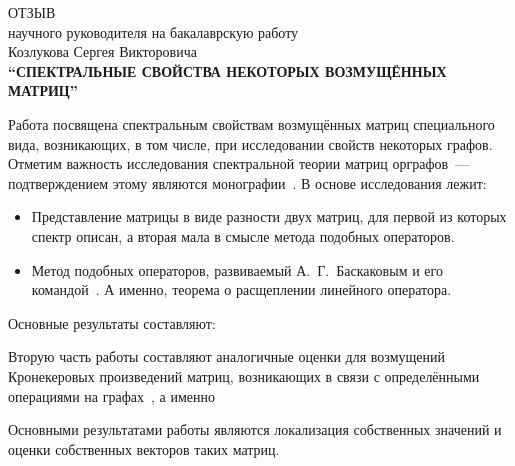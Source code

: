 \begin{center}
  ОТЗЫВ\\
  научного руководителя на бакалаврскую работу\\
  Козлукова Сергея Викторовича\\
  \textbf{``СПЕК\-ТРАЛЬНЫЕ СВОЙ\-СТВА НЕКОТОРЫХ ВОЗМУЩ\-ЁННЫХ МАТРИЦ''}
\end{center}

Работа посвящена спектральным свойствам возмущённых матриц
специального вида, возникающих, в том числе, при исследовании свойств некоторых
графов. Отметим важность исследования спектральной теории матриц орграфов~---%
подтверждением этому являются монографии~\cite{cvetkovic1997eigenspaces,cvetkovic1980spectra,godsil2013algebraic}.
В основе исследования лежит:
\begin{itemize}
  \item Представление матрицы в виде разности двух матриц, для первой из которых
    спектр описан, а вторая мала в смысле метода подобных операторов.
    \item Метод подобных операторов, развиваемый А.~Г.~Баскаковым и его
      командой~\cite{baskakov1986theorem,baskakov1994spectral,baskakov2002splitting}.
      А именно, теорема о расщеплении линейного
      оператора.
\end{itemize}

Основные результаты составляют:

\begin{thm*}
  
\end{thm*}

\begin{thm*}
  
\end{thm*}
    
Вторую часть работы составляют аналогичные оценки для возмущений Кронекеровых
произведений матриц, возникающих в связи с определёнными операциями на
графах~\cite{bellman-matrices-kron,XIANG2005210}, а именно

\begin{thm*}
  
\end{thm*}
  

Основными результатами работы являются локализация собственных значений и оценки
собственных векторов таких матриц.

